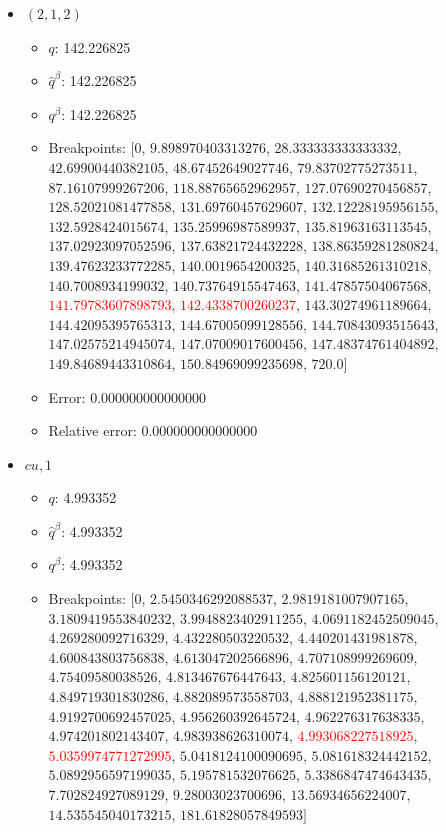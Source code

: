 \documentclass{article}%
\begin{document}
\begin{itemize}
\begin{itemize}
		\item Error: 0.000000000000000%
		\item Relative error: 0.000000000000000%
	\end{itemize}%
	\item $(2, 1, 2)$%
	\begin{itemize}%
		\item $q$: 142.226825%
		\item $\hat{q}^\beta$: 142.226825%
		\item $q^\beta$: 142.226825%
		\item Breakpoints: $[$$0$, $9.898970403313276$, $28.333333333333332$, $42.69900440382105$, $48.67452649027746$, $79.83702775273511$, $87.16107999267206$, $118.88765652962957$, $127.07690270456857$, $128.52021081477858$, $131.69760457629607$, $132.12228195956155$, $132.5928424015674$, $135.25996987589937$, $135.81963163113545$, $137.02923097052596$, $137.63821724432228$, $138.86359281280824$, $139.47623233772285$, $140.0019654200325$, $140.31685261310218$, $140.7008934199032$, $140.73764915547463$, $141.47857504067568$, \textcolor{red}{$141.79783607898793$}, \textcolor{red}{$142.4338700260237$}, $143.30274961189664$, $144.42095395765313$, $144.67005099128556$, $144.70843093515643$, $147.02575214945074$, $147.07009017600456$, $147.48374761404892$, $149.84689443310864$, $150.84969099235698$, $720.0$$]$%
		\item Error: 0.000000000000000%
		\item Relative error: 0.000000000000000%
	\end{itemize}%
	\item $\textit{cu},1$%
	\begin{itemize}%
		\item $q$: 4.993352%
		\item $\hat{q}^\beta$: 4.993352%
		\item $q^\beta$: 4.993352%
		\item Breakpoints: $[$$0$, $2.5450346292088537$, $2.9819181007907165$, $3.1809419553840232$, $3.9948823402911255$, $4.0691182452509045$, $4.269280092716329$, $4.432280503220532$, $4.440201431981878$, $4.600843803756838$, $4.613047202566896$, $4.707108999269609$, $4.75409580038526$, $4.813467676447643$, $4.825601156120121$, $4.849719301830286$, $4.882089573558703$, $4.888121952381175$, $4.9192700692457025$, $4.956260392645724$, $4.962276317638335$, $4.974201802143407$, $4.983938626310074$, \textcolor{red}{$4.993068227518925$}, \textcolor{red}{$5.0359974771272995$}, $5.0418124100090695$, $5.081618324442152$, $5.0892956597199035$, $5.195781532076625$, $5.3386847474643435$, $7.702824927089129$, $9.28003023700696$, $13.56934656224007$, $14.535545040173215$, $181.61828057849593$$]$%

\end{itemize}
\end{itemize}
\end{document}
